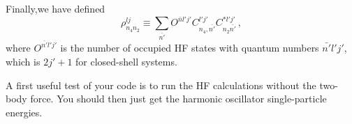 \documentclass[11pt,a4wide]{article}
\begin{document}
Finally,we have defined
\begin{equation}
\rho^{lj}_{n_4n_2} \equiv \sum_{\bar{n'}} O^{\bar{n}l'j'}C^{l'j'}_{n_4,\bar{n'}}C^{*l'j'}_{n_2\bar{n'}}\,,
\end{equation}
where $O^{\bar{n'}l'j'}$ is the number of occupied HF states with quantum numbers $\bar{n'}l'j'$, which is $2j'+1$ for closed-shell systems. 

A first useful test of your code is to run the HF calculations without the two-body force. You should then just get the harmonic oscillator single-particle energies.
\end{document}
